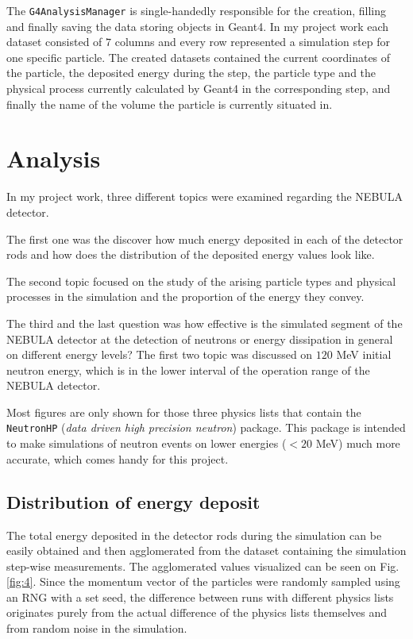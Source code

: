 \begin{multicols}{2}
The \texttt{G4AnalysisManager} is single-handedly responsible for the creation, filling and finally saving the data storing objects in Geant4. In my project work each dataset consisted of $7$ columns and every row represented a simulation step for one specific particle. The created datasets contained the current coordinates of the particle, the deposited energy during the step, the particle type and the physical process currently calculated by Geant4 in the corresponding step, and finally the name of the volume the particle is currently situated in.

\section{Analysis} \label{sec:6}
In my project work, three different topics were examined regarding the NEBULA detector.

The first one was the discover how much energy deposited in each of the detector rods and how does the distribution of the deposited energy values look like.

The second topic focused on the study of the arising particle types and physical processes in the simulation and the proportion of the energy they convey.

The third and the last question was how effective is the simulated segment of the NEBULA detector at the detection of neutrons or energy dissipation in general on different energy levels? The first two topic was discussed on $120$ MeV initial neutron energy, which is in the lower interval of the operation range of the NEBULA detector.

Most figures are only shown for those three physics lists that contain the \texttt{NeutronHP} (\textit{data driven high precision neutron}) package. This package is intended to make simulations of neutron events on lower energies ($<20$ MeV) much more accurate, which comes handy for this project.

\subsection{Distribution of energy deposit} \label{ssec:6.1}
The total energy deposited in the detector rods during the simulation can be easily obtained and then agglomerated from the dataset containing the simulation step-wise measurements. The agglomerated values visualized can be seen on Fig. \ref{fig:4}.  Since the momentum vector of the particles were randomly sampled using an RNG with a set seed, the difference between runs with different physics lists originates purely from the actual difference of the physics lists themselves and from random noise in the simulation.


\end{multicols}
